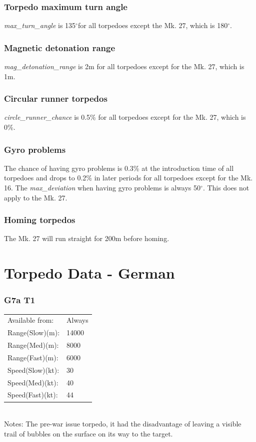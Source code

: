 \documentclass{article}
\newcommand{\degree}{$^{\circ}$}
\begin{document}
\subsubsection{Torpedo maximum turn angle}
\emph{max\_turn\_angle} is 135\degree for all torpedoes except the Mk. 27, which is 180\degree.
\subsubsection{Magnetic detonation range}
\emph{mag\_detonation\_range} is 2m for all torpedoes except for the Mk. 27, which is 1m.
\subsubsection{Circular runner torpedos}
\emph{circle\_runner\_chance} is 0.5\% for all torpedoes except for the Mk. 27, which is 0\%.
\subsubsection{Gyro problems}
The chance of having gyro problems is 0.3\% at the introduction time of all torpedoes and drops to 0.2\% in later periods for all torpedoes except for the Mk. 16. The \emph{max\_deviation} when having gyro problems is always 50\degree. This does not apply to the Mk. 27. 
\subsubsection{Homing torpedos}
The Mk. 27 will run straight for 200m before homing.

\clearpage

\section{Torpedo Data - German }

\subsubsection{G7a T1}
\begin{tabular}{l|l}
Available from:& Always\\
Range(Slow)(m):& 14000\\
Range(Med)(m):& 8000\\
Range(Fast)(m):& 6000\\
Speed(Slow)(kt):& 30\\
Speed(Med)(kt):& 40\\
Speed(Fast)(kt):& 44\\
\end{tabular} \\
Notes:
The pre-war issue torpedo, it had the disadvantage of leaving a visible trail of bubbles on the surface on its way to the target. \cite{uboatnetTorpedoes}
\end{document}
